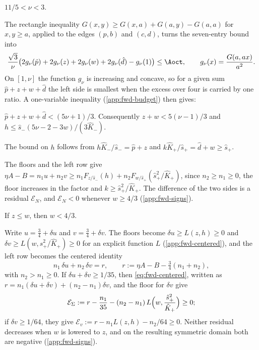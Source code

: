 \begin{lemma}\label{lem:fwd-threshold}
$11/5<\nu<3$.
\end{lemma}

 The rectangle inequality
$G(x,y)\ge G(x,a)+G(a,y)-G(a,a)$ for $x,y\ge a$, applied to the edges $(p,b)$ and $(c,d)$, turns
the seven-entry bound into
\[
\frac{\sqrt3}{\nu}\bigl(2g_\nu(\hat p)+2g_\nu(z)+2g_\nu(w)+2g_\nu(\hat d)-g_\nu(1)\bigr)\le\Aoct,
\qquad g_\nu(x)=\frac{G(a,ax)}{a^2}.
\]
On $[1,\nu]$ the function $g_\nu$ is increasing and concave, so for a given sum
$\hat p+z+w+\hat d$ the left side is smallest when the excess over four is carried by one ratio. A
one-variable inequality (\cref{app:fwd-budget}) then gives:

\begin{lemma}\label{lem:fwd-budget}
$\hat p+z+w+\hat d<(5\nu+1)/3$. Consequently $z+w<5(\nu-1)/3$ and
$h\le\hat s_-(5\nu-2-3w)/(3\hat K_-)$.
\end{lemma}

The bound on $h$ follows from $h\hat K_-/\hat s_-=\hat p+z$ and $k\hat K_+/\hat s_+=\hat d+w\ge
\hat s_+$.

 The floors and the left row give
$\eta A-B=n_1u+n_2v\ge n_1F_{z/\hat s_-}(h)+n_2F_{w/\hat s_+}(\hat s_+^2/\hat K_+)$, since
$n_2\ge n_1\ge0$, the floor increases in the factor and $k\ge\hat s_+^2/\hat K_+$. The difference of
the two sides is a residual $\mathcal E_N$, and $\mathcal E_N<0$ whenever $w\ge4/3$
(\cref{app:fwd-signs}).

\begin{lemma}\label{lem:fwd-neighbour}
If $z\le w$, then $w<4/3$.
\end{lemma}

 Write $u=\frac34+\delta u$ and
$v=\frac34+\delta v$. The floors become $\delta u\ge L(z,h)\ge0$ and
$\delta v\ge L(w,\hat s_+^2/\hat K_+)\ge0$ for an explicit function $L$ (\cref{app:fwd-centered}),
and the left row becomes the centered identity
\begin{equation}\label{eq:fwd-centered}
n_1\,\delta u+n_2\,\delta v=r,\qquad r:=\eta A-B-\tfrac34(n_1+n_2),
\end{equation}
with $n_2>n_1\ge0$. If $\delta u+\delta v\ge1/35$, then \eqref{eq:fwd-centered}, written as
$r=n_1(\delta u+\delta v)+(n_2-n_1)\delta v$, and the floor for $\delta v$ give
\[
\mathcal E_\Sigma:=r-\frac{n_1}{35}-(n_2-n_1)\,L\Bigl(w,\frac{\hat s_+^2}{\hat K_+}\Bigr)\ge0;
\]
if $\delta v\ge1/64$, they give $\mathcal E_v:=r-n_1L(z,h)-n_2/64\ge0$. Neither residual decreases
when $w$ is lowered to $z$, and on the resulting symmetric domain both are negative
(\cref{app:fwd-signs}).

